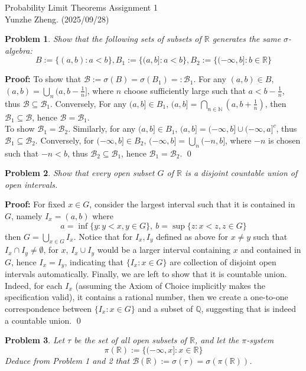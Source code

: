 \documentclass[12pt]{article}
\newtheorem{problem}{Problem}
\begin{document}
\noindent Probability Limit Theorems \hfill Assignment 1\\
Yunzhe Zheng. (2025/09/28)

\hrulefill

\begin{problem}
    Show that the following sets of subsets of $\mathbb{R}$ generates the same $\sigma$-algebra:
    $$
        B:=\{(a, b): a<b\}, B_1:=\{(a,b]: a<b\}, B_2:=
        \{(-\infty, b]: b\in\mathbb{R}\}
    $$
\end{problem}

\textbf{Proof:} To show that $\mathcal{B}:=\sigma(B)=\sigma(B_1)=:\mathcal{B}_1$. For any $(a,b)\in B$, $(a, b)=\bigcup_{n}(a, b-\frac{1}{n}]$, where $n$ choose sufficiently large such that $a<b-\frac{1}{n}$, thus $\mathcal{B}\subseteq\mathcal{B}_1$. Conversely, For any $(a,b]\in B_1$, $(a,b]=\bigcap_{n\in\mathbb{N}}\left(a, b+\frac{1}{n}\right)$, then $\mathcal{B}_1\subseteq\mathcal{B}$, hence $\mathcal{B}=\mathcal{B}_1$.\\ 
\indent To show $\mathcal{B}_1=\mathcal{B}_2$. Similarly, for any $(a,b]\in B_1$, $(a,b]=(-\infty, b]\cup(-\infty, a]^c$, thus $\mathcal{B}_1\subseteq\mathcal{B}_2$. Conversely, for $(-\infty, b]\in B_2$, $(-\infty, b]=\bigcup_n (-n, b]$, where $-n$ is chosen such that $-n<b$, thus $\mathcal{B}_2\subseteq\mathcal{B}_1$, hence $\mathcal{B}_1=\mathcal{B}_2$. \qed
\\
\begin{problem}
    Show that every open subset $G$ of $\mathbb{R}$ is a disjoint countable union of open intervals.
\end{problem}

\textbf{Proof:} For fixed $x\in G$, consider the largest interval such that it is contained in $G$, namely $I_x=(a, b)$ where 
$$
    a =\inf\{y: y<x, y\in G\}, \ b=\sup\{z: x<z,z\in G\}
$$ 
then $G=\bigcup_{x\in G}I_x$. Notice that for $I_x,I_y$ defined as above for $x\neq y$ such that $I_x\cap I_y\neq\emptyset$, for $x$, $I_x\cup I_y$ would be a larger interval containing $x$ and contained in $G$, hence $I_x=I_y$, indicating that $\{I_x: x\in G\}$ are collection of disjoint open intervals automatically. Finally, we are left to show that it is countable union. Indeed, for each $I_x$ (assuming the Axiom of Choice implicitly makes the specification valid), it contains a rational number, then we create a one-to-one correspondence between $\{I_x:x\in G\}$ and a subset of $\mathbb{Q}$, suggesting that is indeed a countable union. \qed
\\ 
\begin{problem}
    Let $\tau$ be the set of all open subsets of $\mathbb{R}$, and let the $\pi$-system
    $$
        \pi(\mathbb{R}):=\{(-\infty,x]: x\in\mathbb{R}\}
    $$ Deduce from Problem 1 and 2 that $\mathcal{B}(\mathbb{R}):=\sigma(\tau)=\sigma(\pi(\mathbb{R}))$.
\end{problem}
\end{document}
